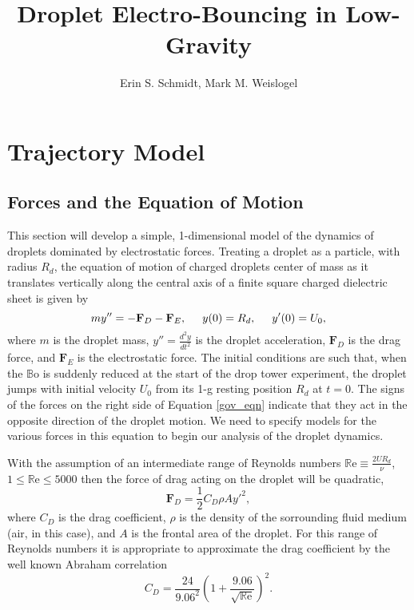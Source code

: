 \documentclass[a4paper, 12pt]{article}
\title{\textsf{\textbf{Droplet Electro-Bouncing in Low-Gravity}}}
\author{Erin S. Schmidt, Mark M. Weislogel}
\date{}
\begin{document}

\doublespacing

\section{Trajectory Model}
\subsection{Forces and the Equation of Motion}
This section will develop a simple, 1-dimensional model of the dynamics of droplets dominated by electrostatic forces. Treating a droplet as a particle, with radius $R_d$, the  equation of motion of charged droplets center of mass as it translates vertically along the central axis of a finite square charged dielectric sheet is given by
\begin{equation}
m y'' = - \mathbf{F}_D - \mathbf{F}_E, \hspace{5 mm} y(0) = R_d, \hspace{5 mm} y'(0) = U_0,
\label{gov_eqn}
\end{equation}
where $m$ is the droplet mass, $y'' = \frac{d^2 y}{d t^2}$ is the droplet acceleration, $\mathbf{F}_D$ is the drag force, and $\mathbf{F}_E$ is the electrostatic force. The initial conditions are such that, when the $\mathbb{B}\mbox{o}$ is suddenly reduced at the start of the drop tower experiment, the droplet jumps with initial velocity $U_0$ from its 1-g resting position $R_d$ at $t=0$. The signs of the forces on the right side of Equation \ref{gov_eqn} indicate that they act in the opposite direction of the droplet motion. We need to specify models for the various forces in this equation to begin our analysis of the droplet dynamics.

With the assumption of an intermediate range of Reynolds numbers $\mathbb{R}\mbox{e} \equiv \frac{2UR_d}{\nu}$, $1 \leq \mathbb{R}\mbox{e} \leq 5000 $ then the force of drag acting on the droplet will be quadratic,
\begin{equation*}\label{drag_force}
\mathbf{F}_D = \frac{1}{2}C_D \rho A {y'}^2,
\end{equation*}
where $C_D$ is the drag coefficient, $\rho$ is the density of the sorrounding fluid medium (air, in this case), and $A$ is the frontal area of the droplet. For this range of Reynolds numbers it is appropriate to approximate the drag coefficient by the well known Abraham correlation \cite{abraham_functional_1970}
\[C_D = \frac{24}{9.06^2} \left( 1 + \frac{9.06}{\sqrt{\mathbb{R}\mbox{e}}} \right)^2 .\]
\end{document}
